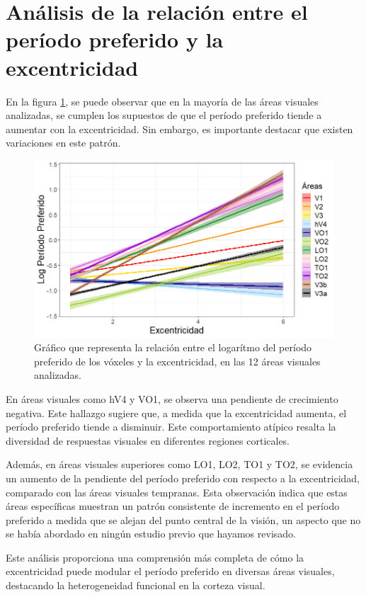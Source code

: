 \section{Análisis de la relación entre el período preferido y la excentricidad}

En la figura \ref{fig:pp_vs_eccen}, se puede observar que en la mayoría de las áreas visuales analizadas, se cumplen los supuestos de que el período preferido tiende a aumentar con la excentricidad. Sin embargo, es importante destacar que existen variaciones en este patrón.

\begin{figure}[h]
	\centering
	\includegraphics[scale=0.6]{Graphics/pp_vs_eccen}
	\caption{Gráfico que representa la relación entre el logar\'itmo del per\'iodo preferido de los v\'oxeles y la excentricidad, en las 12 áreas visuales analizadas.}
	\label{fig:pp_vs_eccen}
\end{figure}

En áreas visuales como hV4 y VO1, se observa una pendiente de crecimiento negativa. Este hallazgo sugiere que, a medida que la excentricidad aumenta, el período preferido tiende a disminuir. Este comportamiento atípico resalta la diversidad de respuestas visuales en diferentes regiones corticales.

Además, en áreas visuales superiores como LO1, LO2, TO1 y TO2,  se evidencia un aumento de la pendiente del período preferido con respecto a la excentricidad, comparado con las áreas visuales tempranas. Esta observación indica que estas áreas específicas muestran un patrón consistente de incremento en el período preferido a medida que se alejan del punto central de la visión, un aspecto que no se había abordado en ningún estudio previo que hayamos revisado.

Este análisis proporciona una comprensión más completa de cómo la excentricidad puede modular el período preferido en diversas áreas visuales, destacando la heterogeneidad funcional en la corteza visual.


